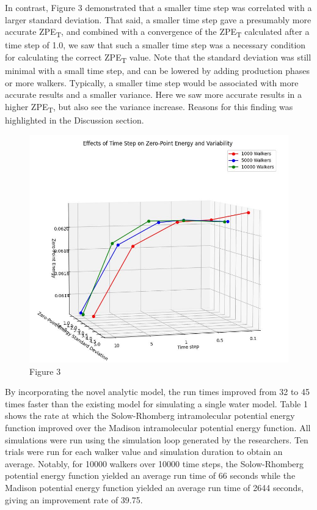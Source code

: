 \documentclass[journal=jacsat,manuscript=article]{achemso}
\begin{document}
In contrast, Figure 3 demonstrated that a smaller time step was correlated with a larger standard deviation. That said, a smaller time step gave a presumably more accurate ZPE\textsubscript{T}, and combined with a convergence of the ZPE\textsubscript{T} calculated after a time step of 1.0, we saw that such a smaller time step was a necessary condition for calculating the correct ZPE\textsubscript{T} value. Note that the standard deviation was still minimal with a small time step, and can be lowered by adding production phases or more walkers. Typically, a smaller time step would be associated with more accurate results and a smaller variance. Here we saw more accurate results in a higher ZPE\textsubscript{T}, but also see the variance increase. Reasons for this finding was highlighted in the Discussion section.

\begin{figure}
  \includegraphics[width=\linewidth]{fig_3.jpg}
  \caption{Figure 3}
  \label{fig:}
\end{figure}

By incorporating the novel analytic model, the run times improved from 32 to 45 times faster than the existing model for simulating a single water model. Table 1 shows the rate at which the Solow-Rhomberg intramolecular potential energy function improved over the Madison intramolecular potential energy function. All simulations were run using the simulation loop generated by the researchers. Ten trials were run for each walker value and simulation duration to obtain an average. Notably, for 10000 walkers over 10000 time steps, the Solow-Rhomberg potential energy function yielded an average run time of 66 seconds while the Madison potential energy function yielded an average run time of 2644 seconds, giving an improvement rate of 39.75.
\end{document}
